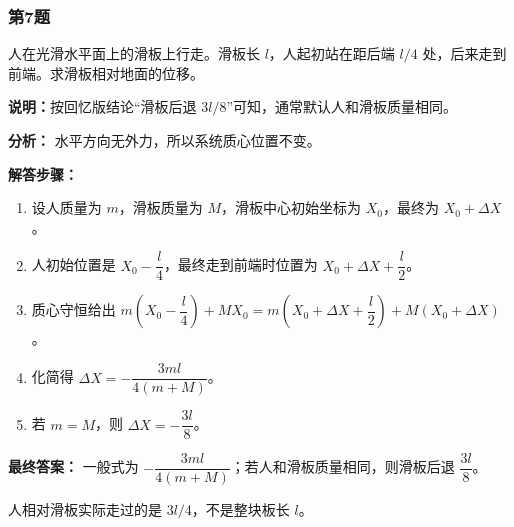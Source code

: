 \documentclass[12pt,a4paper]{ctexart}
\begin{document}
\subsubsection*{第7题}
\begin{tcolorbox}[colback=gray!2!white,colframe=black!60,title={题目}]
人在光滑水平面上的滑板上行走。滑板长 \(l\)，人起初站在距后端 \(l/4\) 处，后来走到前端。求滑板相对地面的位移。\par
\vspace{0.4em}
\textbf{说明：}按回忆版结论“滑板后退 \(3l/8\)”可知，通常默认人和滑板质量相同。\par
\end{tcolorbox}
\begin{tcolorbox}[colback=blue!2!white,colframe=blue!55!black,title={完整答案}]
\textbf{分析：}
水平方向无外力，所以系统质心位置不变。\par
\textbf{解答步骤：}
\begin{enumerate}
\item 设人质量为 \(m\)，滑板质量为 \(M\)，滑板中心初始坐标为 \(X_0\)，最终为 \(X_0+\Delta X\)。
\item 人初始位置是 \(X_0-\dfrac l4\)，最终走到前端时位置为 \(X_0+\Delta X+\dfrac l2\)。
\item 质心守恒给出 \(m\left(X_0-\dfrac l4\right)+MX_0=m\left(X_0+\Delta X+\dfrac l2\right)+M(X_0+\Delta X)\)。
\item 化简得 \(\Delta X=-\dfrac{3ml}{4(m+M)}\)。
\item 若 \(m=M\)，则 \(\Delta X=-\dfrac{3l}{8}\)。
\end{enumerate}
\textbf{最终答案：}
一般式为 \(-\dfrac{3ml}{4(m+M)}\)；若人和滑板质量相同，则滑板后退 \(\dfrac{3l}{8}\)。\par
\end{tcolorbox}
\begin{tcolorbox}[colback=red!2!white,colframe=red!55!black,title={易错点}]
人相对滑板实际走过的是 \(3l/4\)，不是整块板长 \(l\)。\par
\end{tcolorbox}
\end{document}
